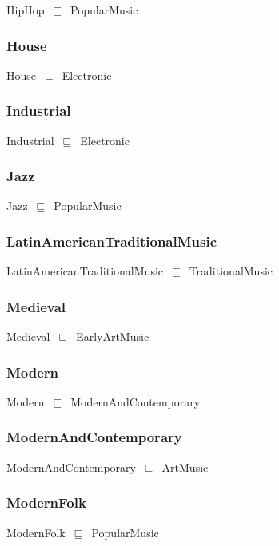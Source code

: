 \documentclass{article}
\begin{document}
HipHop~\ensuremath{\sqsubseteq}~PopularMusic~

\subsubsection*{House}

House~\ensuremath{\sqsubseteq}~Electronic~

\subsubsection*{Industrial}

Industrial~\ensuremath{\sqsubseteq}~Electronic~

\subsubsection*{Jazz}

Jazz~\ensuremath{\sqsubseteq}~PopularMusic~

\subsubsection*{LatinAmericanTraditionalMusic}

LatinAmericanTraditionalMusic~\ensuremath{\sqsubseteq}~TraditionalMusic~

\subsubsection*{Medieval}

Medieval~\ensuremath{\sqsubseteq}~EarlyArtMusic~

\subsubsection*{Modern}

Modern~\ensuremath{\sqsubseteq}~ModernAndContemporary~

\subsubsection*{ModernAndContemporary}

ModernAndContemporary~\ensuremath{\sqsubseteq}~ArtMusic~

\subsubsection*{ModernFolk}

ModernFolk~\ensuremath{\sqsubseteq}~PopularMusic~
\end{document}
